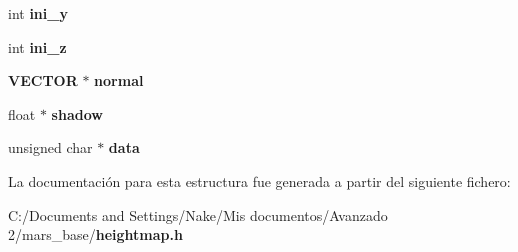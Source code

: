 \begin{DoxyCompactItemize}
\item 
int {\bfseries ini\_\-y}\label{structt__heightmap_a1734dbed3bb23318c015d0120c69b1ed}

\item 
int {\bfseries ini\_\-z}\label{structt__heightmap_a4e949dfc21e0a8fa1472ed207bdc696e}

\item 
{\bf VECTOR} $\ast$ {\bfseries normal}\label{structt__heightmap_a55d443963a7d50b77d04d1a4c1bb91c4}

\item 
float $\ast$ {\bfseries shadow}\label{structt__heightmap_a7d2b2140e8d2b3b2f74e5a3101ce56b5}

\item 
unsigned char $\ast$ {\bfseries data}\label{structt__heightmap_ac24cea2bfcc927fd29bc74d1086707d8}

\end{DoxyCompactItemize}


La documentación para esta estructura fue generada a partir del siguiente fichero:\begin{DoxyCompactItemize}
\item 
C:/Documents and Settings/Nake/Mis documentos/Avanzado 2/mars\_\-base/{\bf heightmap.h}\end{DoxyCompactItemize}
